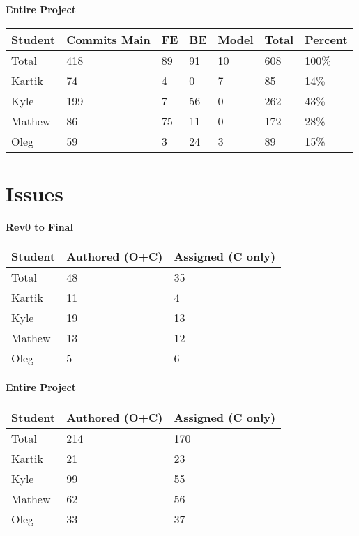 \documentclass{article}
\begin{document}
\begin{table}[H]
    \centering
    \textbf{Entire Project}\\
    \begin{tabular}{lllllll}
    \toprule
    \textbf{Student} & \textbf{Commits Main} & \textbf{FE} & \textbf{BE} & \textbf{Model} & \textbf{Total}& \textbf{Percent}\\
    \midrule
    Total & 418 & 89 & 91 & 10 & 608 & 100\% \\
    Kartik & 74 & 4 & 0 & 7 & 85 & 14\%\\
    Kyle   & 199 & 7 & 56 & 0 & 262 & 43\%\\
    Mathew & 86 & 75 & 11 & 0 & 172 & 28\% \\
    Oleg   & 59 &  3 & 24 & 3 & 89 & 15\% \\
    \bottomrule
    \end{tabular}
\end{table}




\section{Issues} 
\begin{table}[H]
\centering
\textbf{Rev0 to Final}\\
\begin{tabular}{lll}
\toprule
\textbf{Student} & \textbf{Authored (O+C)} & \textbf{Assigned (C only)}\\
\midrule
Total & 48 & 35 \\
Kartik & 11 & 4\\
Kyle   & 19 & 13\\
Mathew & 13 & 12\\
Oleg   & 5 & 6\\
\bottomrule
\end{tabular}
\end{table}


\begin{table}[H]
\centering
\textbf{Entire Project}\\
\begin{tabular}{lll}
\toprule
\textbf{Student} & \textbf{Authored (O+C)} & \textbf{Assigned (C only)}\\
\midrule
Total & 214 & 170 \\
Kartik & 21 & 23\\
Kyle   & 99 & 55\\
Mathew & 62 & 56\\
Oleg   & 33 & 37\\
\bottomrule
\end{tabular}
\end{table}
\end{document}
